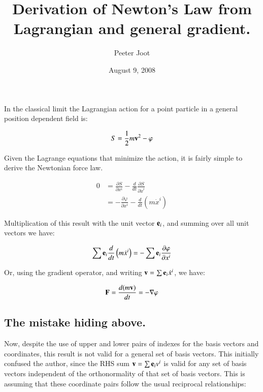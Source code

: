 \documentclass{article}
\title{ Derivation of Newton's Law from Lagrangian and general gradient.}
\author{Peeter Joot}
\date{August 9, 2008}
\newcommand{\grad}[0]{\nabla}
\newcommand{\PD}[2]{ \frac{\partial{#1}}{\partial {#2}} }
\begin{document}
\maketitle{}

\section{}

In the classical limit the Lagrangian action for a point particle in a general
position dependent field is:

\begin{equation}
S = \frac{1}{2} m\mathbf{v}^2 - \varphi
\end{equation}

Given the Lagrange equations that minimize the action, it is fairly simple
to derive the Newtonian force law.

\begin{align*}
0
&= \PD{S}{x^i} - \frac{d}{dt}\PD{S}{\dot{x}^i} \\
&= -\PD{\varphi}{x^i} - \frac{d}{dt}\left(m \dot{x}^i\right)
\end{align*}

Multiplication of this result with the unit vector $\mathbf{e}_i$, and summing over
all unit vectors we have:

\begin{equation*}
\sum \Be_i \frac{d}{dt}\left(m \dot{x}^i\right) = - \sum \Be_i \PD{\varphi}{x^i}
\end{equation*}

Or, using the gradient operator, and writing $\mathbf{v} = \sum \mathbf{e}_i \dot{x}^i$, we have:

\begin{equation}
\BF = \frac{d (m \Bv)}{dt} = - \grad \varphi
\end{equation}

\subsection{ The mistake hiding above. }

Now, despite the use of upper and lower pairs of indexes for the basis vectors and coordinates, this
result is not valid for a general set of basis vectors.  This initially confused the author, since the RHS
sum $\mathbf{v} = \sum \mathbf{e}_i v^i$ is valid for any set of basis vectors independent of the orthonormality of that
set of basis vectors.  This is assuming that these coordinate pairs follow the usual reciprocal relationships:
\end{document}
